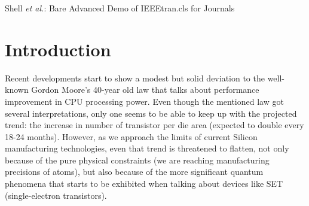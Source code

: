 \documentclass[10pt,journal,compsoc]{IEEEtran}
\begin{document}
%

 \title{}
\author{\selectfont{Tudor Voicu, Saevar Hilmarsson and Misael Hernandez}}

\markboth{}%
{Shell \MakeLowercase{\textit{et al.}}: Bare Advanced Demo of IEEEtran.cls for Journals}

\maketitle

\IEEEdisplaynontitleabstractindextext

\IEEEpeerreviewmaketitle
\begin{abstract}
	\bf{Miniaturization and the fast pace of technological evolution provide a solid base for building high-performance computers into smaller and portable devices. As almost every new shrink in manufacturing node allows a new functional block from the computer's architecture to be included on the same die with the CPU, the graphics processing unit has also been engulfed in the System on Chip. Therefore, this paper is a review of state-of-the-art innovation proposals suited for keeping the memory barrier under control. In our research, we reviewed and thoroughly analyzed a number of three main solutions which tackle different memory-related weak points of a heterogeneous SoC. A fourth article (Dynamic QoS) has been qualitatively reviewed for addressing the improvement in the user-experience feature of a computing device.}
\end{abstract}
\section{Introduction}

\indent Recent developments start to show a modest but solid deviation to the well-known Gordon Moore's 40-year old law that talks about performance improvement in CPU processing power. Even though the mentioned law got several interpretations, only one seems to be able to keep up with the projected trend: the increase in number of transistor per die area (expected to double every 18-24 months). However, as we approach the limits of current Silicon manufacturing technologies, even that trend is threatened to flatten, not only because of the pure physical constraints (we are reaching manufacturing precisions of atoms), but also because of the more significant quantum phenomena that starts to be exhibited when talking about devices like SET (single-electron transistors).
\end{document}
